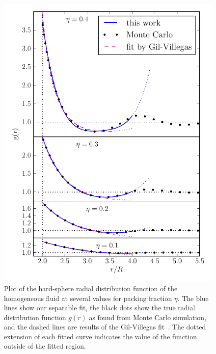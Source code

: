 \begin{figure}
  \centering
  \includegraphics[width=13cm]{figs/short-range-ghs-alt}
  \caption{Plot of the hard-sphere radial distribution function of the
    homogeneous fluid at several values for packing fraction $\eta$. The
    blue lines show our separable fit, the black dots show the true
    radial distribution function $g(r)$ as found from Monte Carlo
    simulation, and the dashed lines are results of the
    Gil-Villegas fit~\cite{gil1997statistical}.  The dotted extension
    of each fitted curve indicates the value of the function outside
    of the fitted region.  }\label{fig:radial-distribution}
\end{figure}

